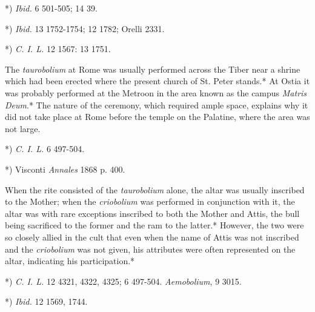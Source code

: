\documentclass[a4paper, 11pt, oneside, polutonikogreek, english]{article}
\begin{document}
*) \emph{Ibid.} 6 501-505; 14 39.

*) \emph{Ibid.} 13 1752-1754; 12 1782; Orelli 2331.

*) \emph{C. I. L.} 12 1567: 13 1751.

The \emph{taurobolium} at Rome was usually performed across the Tiber near a shrine which had been erected where the present church of St. Peter stands.* At Ostia it was probably performed at the Metroon in the area known as the campus \emph{Matris Deum}.* The nature of the ceremony, which required ample space, explains why it did not take place at Rome before the temple on the Palatine, where the area was not large.

*) \emph{C. I. L.} 6 497-504.

*) Visconti \emph{Annales} 1868 p. 400.

When the rite consisted of the \emph{taurobolium} alone, the altar was usually inscribed to the Mother; when the \emph{criobolium} was performed in conjunction with it, the altar was with rare exceptions inscribed to both the Mother and Attis, the bull being sacrificed to the former and the ram to the latter.* However, the two were so closely allied in the cult that even when the name of Attis was not inscribed and the \emph{criobolium} was not given, his attributes were often represented on the altar, indicating his participation.*

*) \emph{C. I. L.} 12 4321, 4322, 4325; 6 497-504. \emph{Aemobolium}, 9 3015.

*) \emph{Ibid.} 12 1569, 1744.
\end{document}
